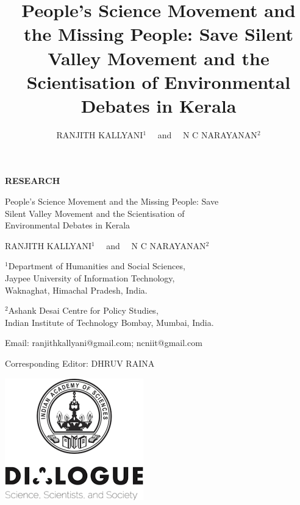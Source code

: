 \documentclass[twoside, 13pt]{article}
\title{People’s Science Movement and the Missing People: Save Silent Valley Movement and the Scientisation of Environmental Debates in Kerala}
\author{{\fontsize{14}{16}\selectfont RANJITH KALLYANI$^{1}$~~ and~~ N C NARAYANAN$^{2}$}}
\date{}
\begin{document}
  
  
  
  
\begin{titlepage}
   \begin{center}
   {\fontsize{14}{16}\selectfont
   {\large\textbf{RESEARCH}}}
   
       \vspace*{1cm}
      {\fontsize{24}{26}\selectfont
       {\LARGE People’s Science Movement and the Missing People: Save\\ Silent Valley Movement and the Scientisation of\\[0.2cm] Environmental Debates in Kerala}
}
       \vspace{0.7cm}
        
            
{\fontsize{14}{16}\selectfont
       {\large RANJITH KALLYANI$^{1}$~~ and~~ N C NARAYANAN$^{2}$}}

       \vspace{0.5cm}
       {\fontsize{14}{16}\selectfont     
      $^{1}$Department of Humanities and Social Sciences,\\ Jaypee University of Information Technology,\\ Waknaghat, Himachal Pradesh, India.
       
       $^{2}$Ashank Desai Centre for Policy Studies,\\ Indian Institute of Technology Bombay, Mumbai, India.
       
       \vspace{0.5cm}
       
       \begin{center}
		Email: ranjithkallyani@gmail.com; ncniit@gmail.com 
		\end{center}
		
		\vspace{.5cm}
		Corresponding Editor: DHRUV RAINA
		
		
		}
       
            
     
     \vfill
       \includegraphics{image/001.jpg}
            
            
   \end{center}
\end{titlepage}
\end{document}
